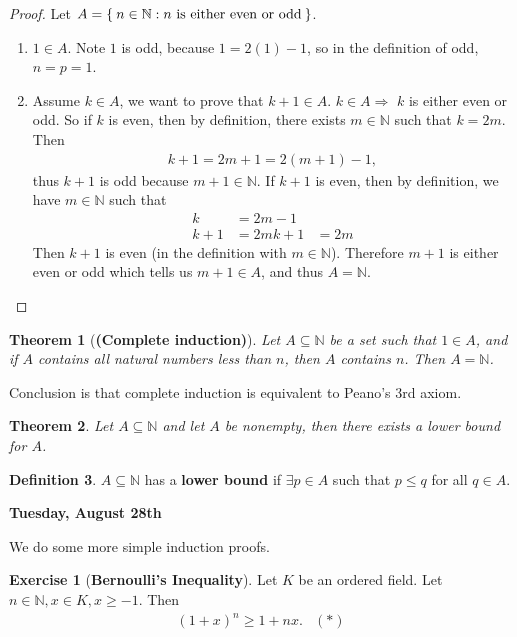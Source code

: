 \documentclass[12pt]{amsbook}
\theoremstyle{plain}
\newtheorem{theorem}{Theorem}[chapter]
\numberwithin{section}{chapter}
\numberwithin{equation}{chapter}
\theoremstyle{definition}
\newtheorem{e}{Exercise}
\newtheorem{Def}[theorem]{Definition}
\theoremstyle{remark}
\theoremstyle{plain}
\newcommand{\sub}{\subseteq}
\newcommand{\n}{\mathbb{N}}
\newcommand{\bee}{\begin{equation}\begin{aligned}}
\newcommand{\eee}{\end{aligned}\end{equation}}
\renewcommand{\leq}{\leqslant}
\renewcommand{\geq}{\geqslant}
\begin{document}
\begin{proof}
Let $A = \Set{n \in \n:n \text{ is either even or odd}}$. 
\begin{enumerate}
\item $1 \in A$. Note $1$ is odd, because $1 = 2(1) - 1$, so in the definition of odd, $n = p = 1$. 
\item Assume $k \in A$, we want to prove that $k + 1 \in A$. $k \in A \Rightarrow$ $k$ is either even or odd. So if $k$ is even, then by definition, there exists $m \in \n$ such that $k = 2m$. Then 
\bee
k + 1 = 2m + 1 = 2(m + 1) - 1,
\eee
thus $k + 1$ is odd because $m + 1 \in \n$. 
If $k + 1$ is even, then by definition, we have $m \in \n$ such that 
\bee
k &= 2m - 1\\
k + 1 &= 2m
k + 1 &= 2m
\eee
Then $k + 1$ is even (in the definition with $m \in \n$). Therefore $m + 1$ is either even or odd which tells us $m + 1 \in A$, and thus $A = \n$. 
\end{enumerate}
\end{proof}

\begin{theorem}[\textbf{(Complete induction)}]
Let $A \sub \n$ be a set such that $1 \in A$, and if $A$ contains all natural numbers less than $n$, then $A$ contains $n$. Then $A = \n$. 
\end{theorem}

Conclusion is that complete induction is equivalent to Peano's 3rd axiom. 

\begin{theorem}
Let $A \sub \n$ and let $A$ be nonempty, then there exists a lower bound for $A$. 
\end{theorem}

\begin{Def}
$A \sub \n$ has a \textbf{lower bound} if $\exists p \in A$ such that $p \leq q$ for all $q \in A$. 
\end{Def}

\textbf{Tuesday, August 28th}

We do some more simple induction proofs. 

\begin{e}[\textbf{Bernoulli's Inequality}]
Let $K$ be an ordered field. Let $n \in \n, x \in K,x \geq -1$. Then 
\bee
(1 + x)^n \geq 1 + nx. & (*)
\eee
\end{e}
\end{document}
